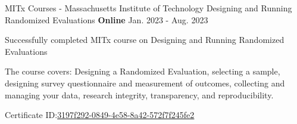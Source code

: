 \begin{cventries}
\cventry
{MITx Courses - Massachusetts Institute of Technology} %
{Designing and Running Randomized Evaluations} %
{\textbf{Online}} %
{Jan. 2023 - Aug. 2023} %
{ %
\begin{cvitems}
\item {Successfully completed MITx course on Designing and Running Randomized Evaluations}
\item {The course covers: Designing a Randomized Evaluation, selecting a sample, designing survey questionnaire and measurement of outcomes, collecting and managing your data, research integrity, transparency, and reproducibility.}
\item {Certificate ID:\href{https://mitxonline.mit.edu/certificate/3197f292-0849-4e58-8a42-572f7f245fe2/}{\space \color{blue}3197f292-0849-4e58-8a42-572f7f245fe2}}
\end{cvitems}
}

\end{cventries}